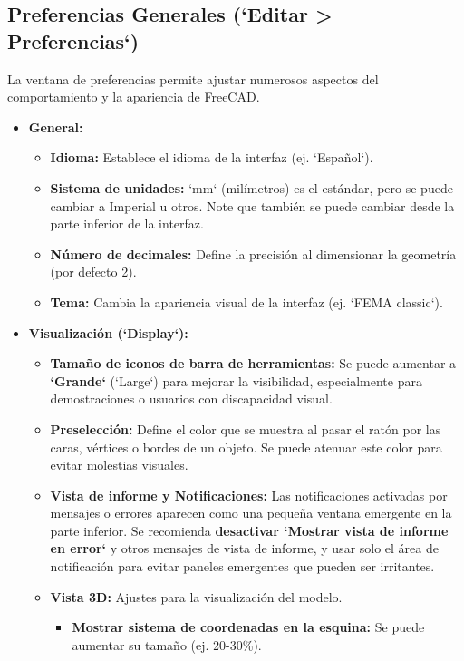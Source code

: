 \documentclass[12pt]{article}
\begin{document}
\subsection{Preferencias Generales (\textbf{`Editar > Preferencias`})}
La ventana de preferencias permite ajustar numerosos aspectos del comportamiento y la apariencia de FreeCAD.
\begin{itemize}[label=\textbullet]
    \item \textbf{General:}
    \begin{itemize}[label=\textendash]
        \item \textbf{Idioma:} Establece el idioma de la interfaz (ej. `Español`).
        \item \textbf{Sistema de unidades:} `mm` (milímetros) es el estándar, pero se puede cambiar a Imperial u otros. Note que también se puede cambiar desde la parte inferior de la interfaz.
        \item \textbf{Número de decimales:} Define la precisión al dimensionar la geometría (por defecto 2).
        \item \textbf{Tema:} Cambia la apariencia visual de la interfaz (ej. `FEMA classic`).
    \end{itemize}
    \item \textbf{Visualización (`Display`):}
    \begin{itemize}[label=\textendash]
        \item \textbf{Tamaño de iconos de barra de herramientas:} Se puede aumentar a \textbf{`Grande`} (`Large`) para mejorar la visibilidad, especialmente para demostraciones o usuarios con discapacidad visual.
        \item \textbf{Preselección:} Define el color que se muestra al pasar el ratón por las caras, vértices o bordes de un objeto. Se puede atenuar este color para evitar molestias visuales.
        \item \textbf{Vista de informe y Notificaciones:} Las notificaciones activadas por mensajes o errores aparecen como una pequeña ventana emergente en la parte inferior. Se recomienda \textbf{desactivar `Mostrar vista de informe en error`} y otros mensajes de vista de informe, y usar solo el área de notificación para evitar paneles emergentes que pueden ser irritantes.
        \item \textbf{Vista 3D:} Ajustes para la visualización del modelo.
        \begin{itemize}[label=\textendash]
            \item \textbf{Mostrar sistema de coordenadas en la esquina:} Se puede aumentar su tamaño (ej. 20-30\%).

\end{itemize}
\end{itemize}
\end{itemize}
\end{document}
